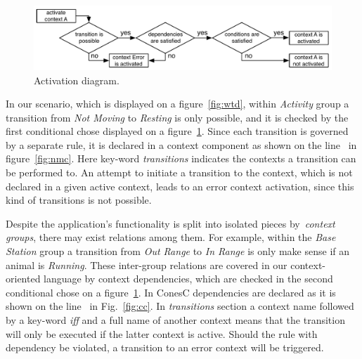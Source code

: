 \begin{figure}[!h]
\centering
\includegraphics[width=\columnwidth]{pdf/activation_diagram}
\caption{Activation diagram.}
\label{fig:ad}
\end{figure}

In our scenario, which is displayed on a figure~\ref{fig:wtd}, within \emph{Activity} group a
transition from \emph{Not Moving} to \emph{Resting} is only possible, and it is checked
by the first conditional chose displayed on a figure~\ref{fig:ad}.
Since each transition is governed by a separate rule, it is declared in a context component as shown
on the line~ in figure~\ref{fig:nmc}. Here key-word \emph{transitions}
indicates the contexts a transition can be performed to. An attempt to initiate
a transition to the context, which is not declared in a given active context, leads to an error context
activation, since this kind of transitions is not possible.



Despite the application's  functionality is split into isolated pieces by~\emph{context groups},
there may exist relations among them. For example, within the 
\emph{Base Station} group a transition from \emph{Out Range} to \emph{In Range} is only
make sense if an animal is \emph{Running}. These inter-group relations are covered in our
context-oriented language by context dependencies, which are checked in the second
conditional chose on a figure~\ref{fig:ad}. In ConesC dependencies are declared as
it is shown on the line~ in Fig.~\ref{fig:cc}. In \emph{transitions} section a
context name followed by a key-word \emph{iff} and a full name of another context means that
the transition will only be executed if the latter context is active. Should the rule with dependency
be violated, a transition to an error context will be triggered.

